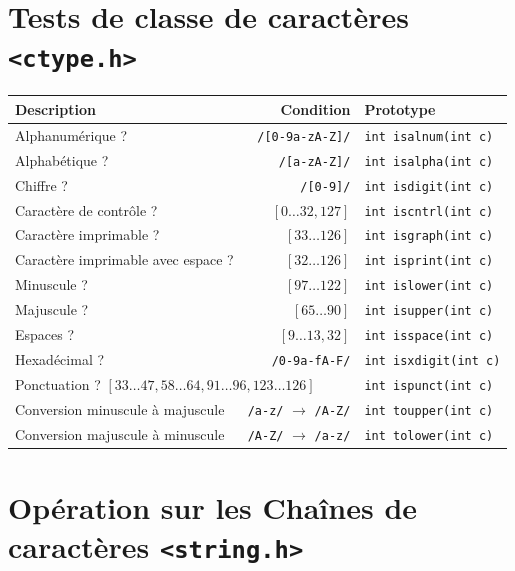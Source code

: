 \documentclass{article}
\newcommand{\cd}{\lstinline}
\begin{document}
\begin{multicols*}{3}
\section*{Tests de classe de caractères \texttt{<ctype.h>}}

\begin{tabularx}{\linewidth}{X|r|l}
  \bf Description         & Condition              & Prototype \\
  \hline
  Alphanumérique ?        & \texttt{/[0-9a-zA-Z]/} & \cd{int isalnum(int c)} \\
  Alphabétique ?          & \texttt{/[a-zA-Z]/} & \cd{int isalpha(int c)} \\
  Chiffre ?               & \texttt{/[0-9]/} & \cd{int isdigit(int c)} \\
  Caractère de contrôle ? & \footnotesize $[0\dots32, 127]$  & \cd{int iscntrl(int c)} \\
  Caractère imprimable ?  & \footnotesize $[33\dots 126]$ & \cd{int isgraph(int c)} \\
  Caractère imprimable avec espace ? & \footnotesize$[32\dots 126]$ & \cd{int isprint(int c)} \\
  Minuscule ?             & \footnotesize $[97\dots 122]$ & \cd{int islower(int c)} \\
  Majuscule ?             & \footnotesize $[65\dots 90]$ & \cd{int isupper(int c)} \\
  Espaces ?               & \footnotesize $[9\dots13,32]$ & \cd{int isspace(int c)} \\
  Hexadécimal ?           & \texttt{/0-9a-fA-F/} &  \cd{int isxdigit(int c)} \\
  \multicolumn{2}{l|}{Ponctuation ? \hfill\footnotesize $[33\dots 47, 58\dots64, 91\dots96, 123\dots126]$} & \cd{int ispunct(int c)} \\
  \hline
  Conversion minuscule à majuscule & \texttt{/a-z/} $\to$ \texttt{/A-Z/} & \cd{int toupper(int c)} \\
  Conversion majuscule à minuscule & \texttt{/A-Z/} $\to$ \texttt{/a-z/} & \cd{int tolower(int c)} \\
\end{tabularx}

\section*{Opération sur les Chaînes de caractères \texttt{<string.h>}}


\end{multicols*}
\end{document}
